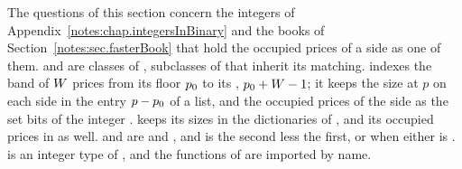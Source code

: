 The questions of this section concern the integers of Appendix~\ref{notes:chap.integersInBinary}
and the books of Section~\ref{notes:sec.fasterBook} that hold the occupied prices of a side as one of them.
 and  are classes of ,
subclasses of  that inherit its matching.
 indexes the band of $W$ prices
from its floor $p_0$ to its , $p_0 + W - 1$;
it keeps the size at $p$ on each side in the entry $p - p_0$ of a list,
and the occupied prices of the side  as the set bits of the integer .
 keeps its sizes in the dictionaries of ,
and its occupied prices in  as well.
 and  are
 and ,
and  is the second less the first, or  when either is .
 is an integer type of ,
and the functions of  are imported by name.

